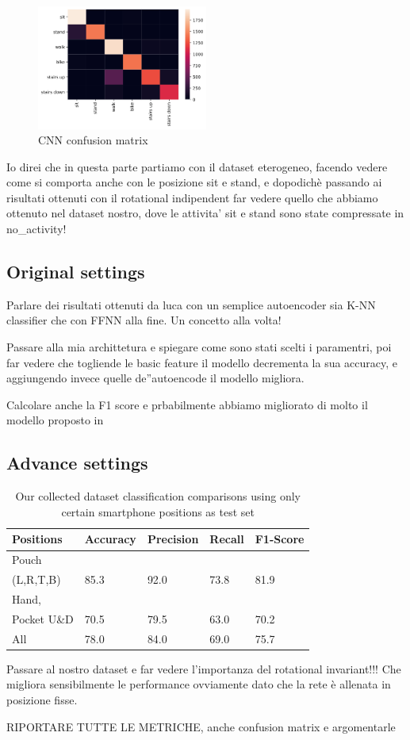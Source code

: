 \begin{figure}[h]
  \centering
  \includegraphics[width=0.5\textwidth]{images/confusion_matrix.png}
  \caption{CNN confusion matrix}
  \label{fig:cnn-confusion-matrix}
\end{figure}

Io direi che in questa parte partiamo con il dataset eterogeneo, facendo vedere come si comporta anche con le posizione sit e stand, e dopodichè passando ai risultati ottenuti con il rotational indipendent far vedere quello che abbiamo ottenuto nel dataset nostro, dove le attivita' sit e stand sono state compressate in no\_activity!

\subsection{Original settings}

Parlare dei risultati ottenuti da luca con un semplice autoencoder sia K-NN classifier che con FFNN alla fine. Un concetto alla volta!

Passare alla mia archittetura e spiegare come sono stati scelti i paramentri, poi far vedere che togliende le basic feature il modello decrementa la sua accuracy, e aggiungendo invece quelle de''autoencode il modello migliora. 

Calcolare anche la F1 score e prbabilmente abbiamo migliorato di molto il modello proposto in \cite{blunck2013heterogeneity}

\subsection{Advance settings}

\begin{table}[t]
	\begin{center}
		\begin{tabular}{ p{1.8cm}p{1.2cm}p{1.2cm}p{0.9cm}p{1.4cm}} 
			\hline
			Positions & Accuracy & Precision & Recall & F1-Score \\ 
			\hline
			Pouch \\(L,R,T,B) & 85.3 & 92.0 & 73.8 & 81.9 \\ 
			\hline
			Hand, \\ Pocket U\&D & 70.5 & 79.5 & 63.0 & 70.2 \\
			\hline
			All & 78.0 & 84.0 & 69.0 & 75.7 \\
			\hline
		\end{tabular}
		\caption{\label{tab:model-performance} Our collected dataset classification comparisons using only certain smartphone positions as test set}
	\end{center}
\end{table}

Passare al nostro dataset e far vedere l'importanza del rotational invariant!!! Che migliora sensibilmente le performance ovviamente dato che la rete è allenata in posizione fisse.

RIPORTARE TUTTE LE METRICHE, anche confusion matrix e argomentarle
